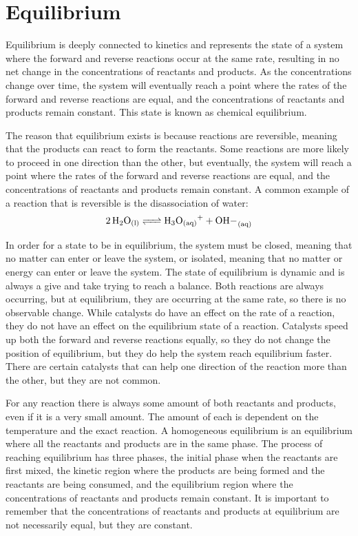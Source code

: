 \section{Equilibrium}
Equilibrium is deeply connected to kinetics and represents the state of a system where the forward and reverse reactions occur at the same rate, resulting in no net change in the concentrations of reactants and products. As the concentrations change over time, the system will eventually reach a point where the rates of the forward and reverse reactions are equal, and the concentrations of reactants and products remain constant. This state is known as chemical equilibrium.

The reason that equilibrium exists is because reactions are reversible, meaning that the products can react to form the reactants. Some reactions are more likely to proceed in one direction than the other, but eventually, the system will reach a point where the rates of the forward and reverse reactions are equal, and the concentrations of reactants and products remain constant. A common example of a reaction that is reversible is the disassociation of water:
\[\ce{2H2O_{(l)} <=> H3O+_{(aq)} + OH-_{(aq)}}\]

In order for a state to be in equilibrium, the system must be closed, meaning that no matter can enter or leave the system, or isolated, meaning that no matter or energy can enter or leave the system. The state of equilibrium is dynamic and is always a give and take trying to reach a balance. Both reactions are always occurring, but at equilibrium, they are occurring at the same rate, so there is no observable change. While catalysts do have an effect on the rate of a reaction, they do not have an effect on the equilibrium state of a reaction. Catalysts speed up both the forward and reverse reactions equally, so they do not change the position of equilibrium, but they do help the system reach equilibrium faster. There are certain catalysts that can help one direction of the reaction more than the other, but they are not common.

For any reaction there is always some amount of both reactants and products, even if it is a very small amount. The amount of each is dependent on the temperature and the exact reaction. A homogeneous equilibrium is an equilibrium where all the reactants and products are in the same phase. The process of reaching equilibrium has three phases, the initial phase when the reactants are first mixed, the kinetic region where the products are being formed and the reactants are being consumed, and the equilibrium region where the concentrations of reactants and products remain constant. It is important to remember that the concentrations of reactants and products at equilibrium are not necessarily equal, but they are constant. 

